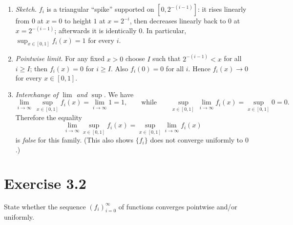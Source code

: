 \documentclass[11pt,a4paper]{article}
\begin{document}
\begin{enumerate}
\renewcommand\labelenumi{(\alph{enumi})}
\item \textit{Sketch.} $f_i$ is a triangular ``spike'' supported on $[0,2^{-(i-1)}]$: it rises linearly
from $0$ at $x=0$ to height $1$ at $x=2^{-i}$, then decreases linearly back to $0$ at $x=2^{-(i-1)}$; afterwards it is identically $0$.
In particular, $\displaystyle \sup_{x\in[0,1]} f_i(x)=1$ for every $i$.

\item \textit{Pointwise limit.} For any fixed $x>0$ choose $I$ such that $2^{-(i-1)}<x$ for all $i\ge I$; then $f_i(x)=0$ for $i\ge I$.
Also $f_i(0)=0$ for all $i$. Hence $f_i(x)\to 0$ for every $x\in[0,1]$.

\item \textit{Interchange of $\lim$ and $\sup$.} We have
\[
\lim_{i\to\infty}\ \sup_{x\in[0,1]} f_i(x)
= \lim_{i\to\infty} 1 = 1,
\qquad\text{while}\qquad
\sup_{x\in[0,1]} \ \lim_{i\to\infty} f_i(x) = \sup_{x\in[0,1]} 0 = 0.
\]
Therefore the equality
\[
\lim_{i\to\infty} \sup_{x\in[0,1]} f_i(x) = \sup_{x\in[0,1]} \lim_{i\to\infty} f_i(x)
\]
is \emph{false} for this family. (This also shows $\{f_i\}$ does not converge uniformly to $0$.)
\end{enumerate}

\section*{Exercise 3.2}
State whether the sequence $(f_i)_{i=0}^\infty$ of functions converges pointwise and/or uniformly.
\end{document}
